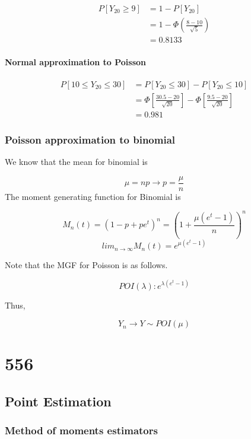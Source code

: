 \documentclass[
]{book}
\begin{document}
\[\begin{aligned} P[Y_{20} \geq 9] &=1-P[Y_{20}] \\ &=1- \Phi(\frac{8-10}{\sqrt{5}}) \\&=0.8133 \end{aligned} \]

\hypertarget{normal-approximation-to-poisson}{%
\subsubsection{Normal approximation to Poisson}\label{normal-approximation-to-poisson}}

\[\begin{aligned} P[10\leq Y_{20} \leq 30] &=P[ Y_{20} \leq 30]-P[ Y_{20} \leq 10] \\&=\Phi[\frac{30.5-20}{\sqrt{20}}]-\Phi[\frac{9.5-20}{\sqrt{20}}] \\ &=0.981 \end{aligned}\]

\hypertarget{poisson-approximation-to-binomial}{%
\subsection{Poisson approximation to binomial}\label{poisson-approximation-to-binomial}}

We know that the mean for binomial is

\[\mu=np \rightarrow p=\frac{\mu}{n}\]
The moment generating function for Binomial is

\[M_n(t)=(1-p+pe^t)^n=(1+\frac{\mu (e^t-1)}{n})^n\]
\[lim_{n \rightarrow \infty} M_n(t)=e^{\mu (e^t-1)}\]

Note that the MGF for Poisson is as follows.

\[POI(\lambda): e^{\lambda(e^t-1)}\]

Thus,

\[Y_n \rightarrow Y \sim POI (\mu)\]

\hypertarget{section-1}{%
\chapter{556}\label{section-1}}

\hypertarget{point-estimation}{%
\section{Point Estimation}\label{point-estimation}}

\hypertarget{method-of-moments-estimators}{%
\subsection{Method of moments estimators}\label{method-of-moments-estimators}}
\end{document}
